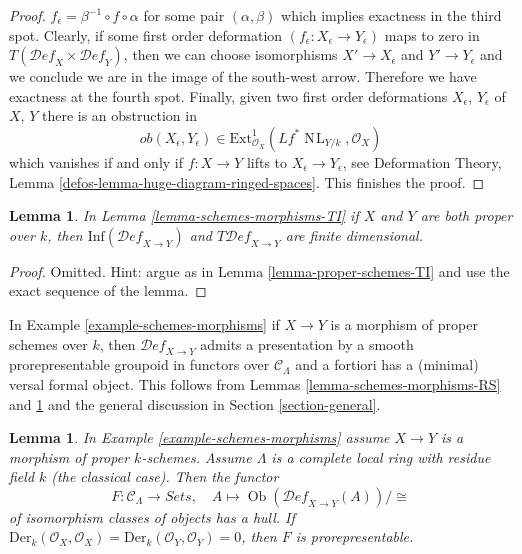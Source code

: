 \documentclass{stacks-project}
\theoremstyle{plain}
\newtheorem{lemma}[subsection]{Lemma}
\theoremstyle{definition}
\theoremstyle{remark}
\numberwithin{equation}{subsection}
\def\Ob{\mathop{\mathrm{Ob}}\nolimits}
\def\NL{\mathop{N\!L}\nolimits}
\def\Deformationcategory{\mathcal{D}\!\mathit{ef}}
\begin{document}
\begin{proof}
$f_\epsilon  = \beta^{-1} \circ f \circ \alpha$ for some
pair $(\alpha, \beta)$ which implies exactness in the third spot.
Clearly, if some first order deformation
$(f_\epsilon : X_\epsilon \to Y_\epsilon)$
maps to zero in $T(\Deformationcategory_X \times \Deformationcategory_Y)$,
then we can choose isomorphisms $X' \to X_\epsilon$ and $Y' \to Y_\epsilon$
and we conclude we are in the image of the south-west arrow.
Therefore we have exactness at the fourth spot.
Finally, given two first order deformations $X_\epsilon$, $Y_\epsilon$
of $X$, $Y$ there is an obstruction in
$$
ob(X_\epsilon, Y_\epsilon) \in
\text{Ext}^1_{\mathcal{O}_X}(Lf^*\NL_{Y/k}, \mathcal{O}_X)
$$
which vanishes if and only if $f : X \to Y$ lifts to
$X_\epsilon \to Y_\epsilon$, see
Deformation Theory, Lemma \ref{defos-lemma-huge-diagram-ringed-spaces}.
This finishes the proof.
\end{proof}

\begin{lemma}
\label{lemma-proper-schemes-morphisms-TI}
In Lemma \ref{lemma-schemes-morphisms-TI} if $X$ and $Y$ are both
proper over $k$, then
$\text{Inf}(\Deformationcategory_{X \to Y})$ and
$T\Deformationcategory_{X \to Y}$ are finite dimensional.
\end{lemma}

\begin{proof}
Omitted. Hint: argue as in Lemma \ref{lemma-proper-schemes-TI}
and use the exact sequence of the lemma.
\end{proof}

\noindent
In Example \ref{example-schemes-morphisms}
if $X \to Y$ is a morphism of proper schemes over $k$,
then $\Deformationcategory_{X \to Y}$
admits a presentation by a smooth prorepresentable groupoid in functors
over $\mathcal{C}_\Lambda$
and a fortiori has a (minimal) versal formal object. This follows
from Lemmas \ref{lemma-schemes-morphisms-RS} and
\ref{lemma-proper-schemes-morphisms-TI}
and the general discussion in Section \ref{section-general}.

\begin{lemma}
\label{lemma-schemes-morphisms-hull}
In Example \ref{example-schemes-morphisms} assume $X \to Y$
is a morphism of proper $k$-schemes.
Assume $\Lambda$ is a complete local ring with residue field $k$
(the classical case). Then the functor
$$
F : \mathcal{C}_\Lambda \longrightarrow \textit{Sets},\quad
A \longmapsto \Ob(\Deformationcategory_{X \to Y}(A))/\cong
$$
of isomorphism classes of objects has a hull. If
$\text{Der}_k(\mathcal{O}_X, \mathcal{O}_X) =
\text{Der}_k(\mathcal{O}_Y, \mathcal{O}_Y) = 0$, then
$F$ is prorepresentable.
\end{lemma}
\end{document}
